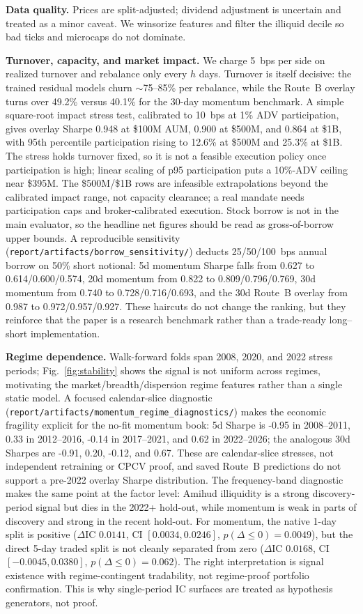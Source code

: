 \documentclass[9pt]{extarticle}
\begin{document}
\textbf{Data quality.} Prices are split-adjusted; dividend adjustment is
uncertain and treated as a minor caveat. We winsorize features and filter the
illiquid decile so bad ticks and microcaps do not dominate.

\textbf{Turnover, capacity, and market impact.} We charge 5~bps per side on
realized turnover and rebalance only every $h$ days. Turnover is itself
decisive: the trained residual models churn $\sim$75--85\% per rebalance, while
the Route~B overlay turns over 49.2\% versus 40.1\% for the 30-day momentum
benchmark. A simple square-root impact stress test, calibrated to 10~bps at
1\% ADV participation, gives overlay Sharpe 0.948 at \$100M AUM, 0.900 at
\$500M, and 0.864 at \$1B, with 95th percentile participation rising to 12.6\%
at \$500M and 25.3\% at \$1B. The stress holds turnover fixed, so it is not a
feasible execution policy once participation is high; linear scaling of p95
participation puts a 10\%-ADV ceiling near \$395M. The \$500M/\$1B rows are
infeasible extrapolations beyond the calibrated impact range, not capacity
clearance; a real mandate needs
participation caps and broker-calibrated execution. Stock borrow is not in the main evaluator, so the
headline net figures should be read as gross-of-borrow upper bounds. A reproducible sensitivity
(\texttt{report/artifacts/borrow\_sensitivity/}) deducts 25/50/100~bps annual
borrow on 50\% short notional: 5d momentum Sharpe falls from 0.627 to
0.614/0.600/0.574, 20d momentum from 0.822 to 0.809/0.796/0.769, 30d momentum
from 0.740 to 0.728/0.716/0.693, and the 30d Route~B overlay from 0.987 to
0.972/0.957/0.927. These haircuts do not change the ranking, but they reinforce
that the paper is a research benchmark rather than a trade-ready long--short
implementation.

\textbf{Regime dependence.} Walk-forward folds span 2008, 2020, and 2022 stress
periods; Fig.~\ref{fig:stability} shows the signal is not uniform across
regimes, motivating the market/breadth/dispersion regime features rather than a
single static model. A focused calendar-slice diagnostic
(\texttt{report/artifacts/momentum\_regime\_diagnostics/}) makes the economic
fragility explicit for the no-fit momentum book: 5d Sharpe is -0.95 in
2008--2011, 0.33 in 2012--2016, -0.14 in 2017--2021, and 0.62 in 2022--2026;
the analogous 30d Sharpes are -0.91, 0.20, -0.12, and 0.67. These are
calendar-slice stresses, not independent retraining or CPCV proof, and saved
Route~B predictions do not support a pre-2022 overlay Sharpe distribution. The
frequency-band diagnostic makes the same point at the factor level: Amihud
illiquidity is a strong discovery-period signal but dies in the 2022+ hold-out,
while momentum is weak in parts of discovery and strong in the recent hold-out.
For momentum, the native 1-day split is positive ($\Delta$IC $0.0141$, CI
$[0.0034,0.0246]$, $p(\Delta\le0)=0.0049$), but the direct 5-day traded split
is not cleanly separated from zero ($\Delta$IC $0.0168$, CI
$[-0.0045,0.0380]$, $p(\Delta\le0)=0.062$). The right interpretation is signal
existence with regime-contingent tradability, not regime-proof portfolio
confirmation.
This is why single-period IC surfaces are treated as hypothesis generators, not
proof.
\end{document}
